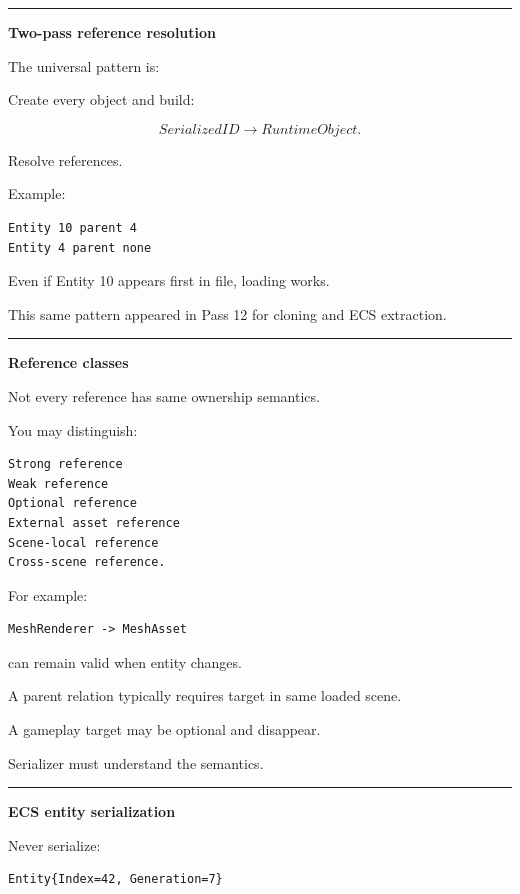 \begin{center}\rule{0.5\linewidth}{0.5pt}\end{center}

\textbf{Two-pass reference resolution}

The universal pattern is:

Create every object and build:

\[
SerializedID
\rightarrow
RuntimeObject.
\]

Resolve references.

Example:

\begin{verbatim}
Entity 10 parent 4
Entity 4 parent none
\end{verbatim}

Even if Entity 10 appears first in file, loading works.

This same pattern appeared in Pass 12 for cloning and ECS extraction.

\begin{center}\rule{0.5\linewidth}{0.5pt}\end{center}

\textbf{Reference classes}

Not every reference has same ownership semantics.

You may distinguish:

\begin{verbatim}
Strong reference
Weak reference
Optional reference
External asset reference
Scene-local reference
Cross-scene reference.
\end{verbatim}

For example:

\begin{verbatim}
MeshRenderer -> MeshAsset
\end{verbatim}

can remain valid when entity changes.

A parent relation typically requires target in same loaded scene.

A gameplay target may be optional and disappear.

Serializer must understand the semantics.

\begin{center}\rule{0.5\linewidth}{0.5pt}\end{center}

\textbf{ECS entity serialization}

Never serialize:

\begin{verbatim}
Entity{Index=42, Generation=7}
\end{verbatim}

